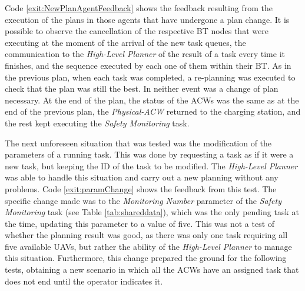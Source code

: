 Code \ref{exit:NewPlanAgentFeedback} shows the feedback resulting from the execution of the plans in those agents that have undergone a plan change. It is possible to observe the cancellation of the respective \gls{BT} nodes that were executing at the moment of the arrival of the new task queues, the communication to the \emph{High-Level Planner} of the result of a task every time it finishes, and the sequence executed by each one of them within their \gls{BT}. As in the previous plan, when each task was completed, a re-planning was executed to check that the plan was still the best. In neither event was a change of plan necessary. At the end of the plan, the status of the \glspl{ACW} was the same as at the end of the previous plan, the \emph{Physical-ACW} returned to the charging station, and the rest kept executing the \emph{Safety Monitoring} task.

The next unforeseen situation that was tested was the modification of the parameters of a running task. This was done by requesting a task as if it were a new task, but keeping the \gls{ID} of the task to be modified. The \emph{High-Level Planner} was able to handle this situation and carry out a new planning without any problems. Code \ref{exit:paramChange} shows the feedback from this test. The specific change made was to the \emph{Monitoring Number} parameter of the \emph{Safety Monitoring} task (see Table \ref{tab:shareddata}), which was the only pending task at the time, updating this parameter to a value of five. This was not a test of whether the planning result was good, as there was only one task requiring all five available \glspl{UAV}, but rather the ability of the \emph{High-Level Planner} to manage this situation. Furthermore, this change prepared the ground for the following tests, obtaining a new scenario in which all the \glspl{ACW} have an assigned task that does not end until the operator indicates it.

